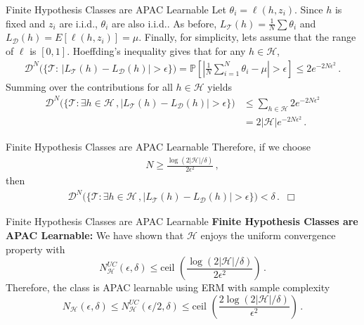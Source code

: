 \documentclass[10pt, table, dvipsnames,handout]{beamer}
\newcommand{\cT}{\ensuremath{\mathcal{T}}}
\newcommand{\cD}{\ensuremath{\mathcal{D}}}
\newcommand{\cH}{\ensuremath{\mathcal{H}}}
\newcommand{\bP}{\ensuremath{\mathbb{P}}}
\begin{document}
\begin{frame}[fragile]{Finite Hypothesis Classes are APAC Learnable}
Let $\theta_i = \ell(h,z_i)$. Since $h$ is fixed and $z_i$ are i.i.d., $\theta_i$ are also i.i.d.. As before, $L_\cT(h) = \frac{1}{N}\sum\theta_i$ and $L_\cD(h) = E[\ell(h,z_i)] = \mu$. Finally, for simplicity, lets assume that the range of $\ell$ is $[0,1]$. \pause Hoeffding's inequality gives that for any $h\in \cH$,
\begin{align*}
\cD^N\Big(\big\{\cT:\,|L_\cT(h)-L_\cD(h)|>\epsilon\big\}\Big) 
= \bP\left[\left| \frac{1}{N}\sum_{i=1}^N\theta_i-\mu \right|>\epsilon\right] \leq 2e^{-2N\epsilon^2}\,.
\end{align*}\pause
Summing over the contributions for all $h\in \cH$ yields
\begin{align*}
\cD^N\Big(\big\{\cT:\exists h\in \mathcal{H}\,,|L_\cT(h)-L_\cD(h)|>\epsilon\big\}\Big)&\leq \sum_{h\in\cH}2e^{-2N\epsilon^2}
\\
&=2|\cH|e^{-2N\epsilon^2}\,.
\end{align*}
\end{frame}




\begin{frame}[fragile]{Finite Hypothesis Classes are APAC Learnable}
Therefore, if we choose
\begin{align*}
N\geq \frac{\log(2|\cH|/\delta)}{2\epsilon^2}\,,
\end{align*}
then 
\begin{align*}
\cD^N\Big(\big\{\cT:\exists h\in \mathcal{H}\,,|L_\cT(h)-L_\cD(h)|>\epsilon\big\}\Big)<\delta\,.\,\,\,\Box
\end{align*}
\end{frame}



\begin{frame}[fragile]{Finite Hypothesis Classes are APAC Learnable}
\textbf{Finite Hypothesis Classes are APAC Learnable:}
We have shown that $\mathcal{H}$ enjoys the uniform convergence property with
$$
N_{\cH}^{UC}(\epsilon,\delta)\leq \text{ceil }\left(\frac{\log(2|\cH|/\delta)}{2\epsilon^2}\right)\,.
$$\pause
Therefore, the class is APAC learnable using ERM with sample complexity 
$$
N_{\cH}(\epsilon,\delta)\leq N_{\cH}^{UC}(\epsilon/2,\delta) \leq \text{ceil }\left(\frac{2\log(2|\cH|/\delta)}{\epsilon^2}\right)\,.
$$
\end{frame}
\end{document}
